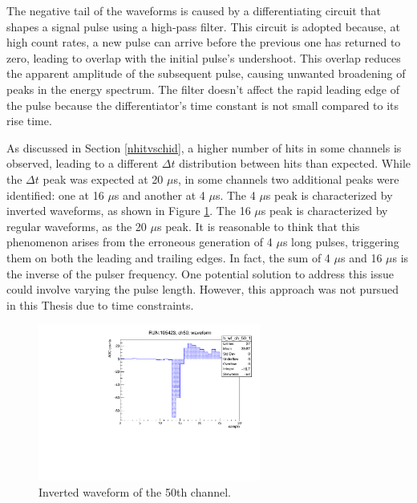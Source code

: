The negative tail of the waveforms is caused by a differentiating circuit that shapes a signal pulse 
using a high-pass filter. This circuit is adopted because, at high count rates, a new pulse can 
arrive before the previous one has returned to zero, leading to overlap with the initial pulse's undershoot. 
This overlap reduces the apparent amplitude of the subsequent pulse, causing unwanted broadening of peaks in the energy spectrum. 
The filter doesn't affect the rapid leading edge of the pulse because the differentiator's time constant is not
small compared to its rise time.



As discussed in Section \ref{nhitvschid}, a higher number of hits in some channels is observed, 
leading to a different $\Delta t$ distribution between hits than expected. 
While the $\Delta t$ peak was expected at 20 $\mu$s, in some channels two additional peaks were identified: 
one at 16 $\mu$s and another at 4 $\mu$s. The 4 $\mu$s peak is characterized by inverted waveforms, as shown in Figure \ref{fig:inverted}. 
The 16 $\mu$s peak is characterized by regular waveforms, as the 20 $\mu$s peak.
It is reasonable to think that this phenomenon arises from the erroneous generation of 4 $\mu$s long pulses, 
triggering them on both the leading and trailing edges. In fact, the sum of 4 $\mu$s and 16 $\mu$s is the inverse of the pulser frequency. 
One potential solution to address this issue could involve varying the pulse length. 
However, this approach was not pursued in this Thesis due to time constraints.
\begin{figure}[!h]
  \centering
  \includegraphics[width=0.65\textwidth]{figures/pdf/wf_ch50_1.pdf}
  \caption{Inverted waveform of the 50th channel.}
 \label{fig:inverted}
\end{figure}

